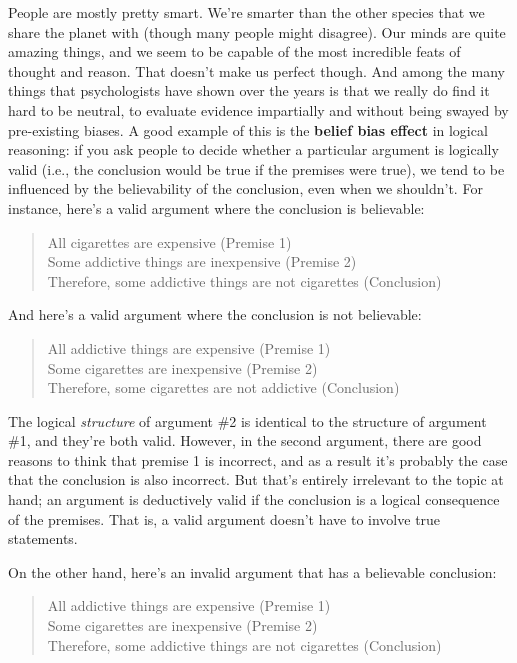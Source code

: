 \documentclass[
  a4paper,
]{book}
\begin{document}
People are mostly pretty smart. We're smarter than the other species
that we share the planet with (though many people might disagree). Our
minds are quite amazing things, and we seem to be capable of the most
incredible feats of thought and reason. That doesn't make us perfect
though. And among the many things that psychologists have shown over the
years is that we really do find it hard to be neutral, to evaluate
evidence impartially and without being swayed by pre-existing biases. A
good example of this is the \textbf{belief bias effect} in logical
reasoning: if you ask people to decide whether a particular argument is
logically valid (i.e., the conclusion would be true if the premises were
true), we tend to be influenced by the believability of the conclusion,
even when we shouldn't. For instance, here's a valid argument where the
conclusion is believable:

\begin{quote}
All cigarettes are expensive (Premise 1)\\
Some addictive things are inexpensive (Premise 2)\\
Therefore, some addictive things are not cigarettes (Conclusion)
\end{quote}

And here's a valid argument where the conclusion is not believable:

\begin{quote}
All addictive things are expensive (Premise 1)\\
Some cigarettes are inexpensive (Premise 2)\\
Therefore, some cigarettes are not addictive (Conclusion)
\end{quote}

The logical \emph{structure} of argument \#2 is identical to the
structure of argument \#1, and they're both valid. However, in the
second argument, there are good reasons to think that premise 1 is
incorrect, and as a result it's probably the case that the conclusion is
also incorrect. But that's entirely irrelevant to the topic at hand; an
argument is deductively valid if the conclusion is a logical consequence
of the premises. That is, a valid argument doesn't have to involve true
statements.

On the other hand, here's an invalid argument that has a believable
conclusion:

\begin{quote}
All addictive things are expensive (Premise 1)\\
Some cigarettes are inexpensive (Premise 2)\\
Therefore, some addictive things are not cigarettes (Conclusion)
\end{quote}
\end{document}
